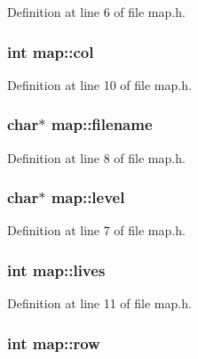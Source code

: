 Definition at line 6 of file map.\-h.

\hypertarget{structmap_a17f43879c500b6eda91e0cb9f15e35ef}{
\subsubsection[{col}]{\setlength{\rightskip}{0pt plus 5cm}int map\-::col}}\label{structmap_a17f43879c500b6eda91e0cb9f15e35ef}


Definition at line 10 of file map.\-h.

\hypertarget{structmap_a97e69cb2956cef929f4ab59bbacbbe38}{
\subsubsection[{filename}]{\setlength{\rightskip}{0pt plus 5cm}char$\ast$ map\-::filename}}\label{structmap_a97e69cb2956cef929f4ab59bbacbbe38}


Definition at line 8 of file map.\-h.

\hypertarget{structmap_a8d663a5c112a6cfb7d5d60fd0e1644bf}{
\subsubsection[{level}]{\setlength{\rightskip}{0pt plus 5cm}char$\ast$ map\-::level}}\label{structmap_a8d663a5c112a6cfb7d5d60fd0e1644bf}


Definition at line 7 of file map.\-h.

\hypertarget{structmap_afa4e098c337ab3f759697aea8265c088}{
\subsubsection[{lives}]{\setlength{\rightskip}{0pt plus 5cm}int map\-::lives}}\label{structmap_afa4e098c337ab3f759697aea8265c088}


Definition at line 11 of file map.\-h.

\hypertarget{structmap_a7b68ca786a01c2030b6c387f99dcc4d2}{
\subsubsection[{row}]{\setlength{\rightskip}{0pt plus 5cm}int map\-::row}}\label{structmap_a7b68ca786a01c2030b6c387f99dcc4d2}


